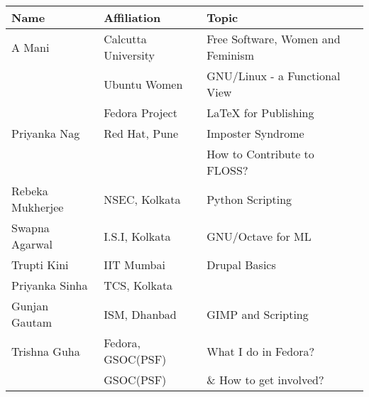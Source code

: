 \documentclass[17pt, a1paper, portrait, margin=0mm, innermargin=15mm, blockverticalspace=9mm, colspace=6mm, subcolspace=3mm]{tikzposter}
\begin{document}
\begin{columns}
{\begin{tabular}{lll}
 \toprule
\textbf{Name} & \textbf{Affiliation} & \textbf{Topic}\\ 
\toprule
A Mani & Calcutta University & Free Software, Women and Feminism\\
      & Ubuntu Women  &  GNU/Linux - a Functional View\\
 & Fedora Project  & LaTeX for Publishing\\
\midrule 
Priyanka Nag & Red Hat, Pune & Imposter Syndrome \\
             &         & How to Contribute to FLOSS? \\
\midrule
Rebeka Mukherjee & NSEC, Kolkata & Python Scripting \\
\midrule
Swapna Agarwal & I.S.I, Kolkata & GNU/Octave for ML\\
\midrule
Trupti Kini &  IIT Mumbai & Drupal Basics \\
\midrule
Priyanka Sinha & TCS, Kolkata &    \\
\midrule
Gunjan Gautam & ISM, Dhanbad & GIMP and Scripting\\
\midrule
Trishna Guha & Fedora, GSOC(PSF) & What I do in Fedora?\\
             & GSOC(PSF)      & \& How to get involved?\\
\bottomrule
\end{tabular}}

\end{columns}
\end{document}
